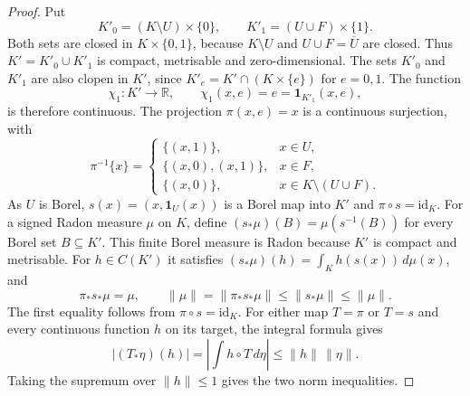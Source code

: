 \documentclass[a4paper,11pt]{amsart}
\theoremstyle{plain}
\theoremstyle{definition}
\theoremstyle{remark}
\newcommand{\R}{\mathbb R}
\newcommand{\one}{\mathbf 1}
\numberwithin{equation}{section}
\begin{document}
\begin{proof}
Put
\[
 K'_0=(K\setminus U)\times\{0\},\qquad
 K'_1=(U\cup F)\times\{1\}.
\]
Both sets are closed in $K\times\{0,1\}$, because $K\setminus U$
and $U\cup F=\overline U$ are closed. Thus $K'=K'_0\cup K'_1$ is
compact, metrisable and zero-dimensional. The sets $K'_0$ and $K'_1$
are also clopen in $K'$, since
$K'_e=K'\cap(K\times\{e\})$ for $e=0,1$. The function
\[
 \chi_1:K'\longrightarrow\R,\qquad
 \chi_1(x,e)=e=\one_{K'_1}(x,e),
\]
is therefore continuous. The projection $\pi(x,e)=x$ is a continuous
surjection, with
\[
 \pi^{-1}\{x\}=
 \begin{cases}
 \{(x,1)\},&x\in U,\\
 \{(x,0),(x,1)\},&x\in F,\\
 \{(x,0)\},&x\in K\setminus(U\cup F).
 \end{cases}
\]
As $U$ is Borel, $s(x)=(x,\one_U(x))$ is a Borel map into $K'$
and $\pi\circ s=\mathrm{id}_K$.
For a signed Radon measure $\mu$ on $K$, define
$(s_*\mu)(B)=\mu(s^{-1}(B))$ for every Borel set $B\subseteq K'$.
This finite Borel measure is Radon because $K'$ is compact and
metrisable. For $h\in C(K')$ it satisfies
$(s_*\mu)(h)=\int_K h(s(x))\,d\mu(x)$, and
\[
 \pi_*s_*\mu=\mu,\qquad
 \|\mu\|=\|\pi_*s_*\mu\|\leqslant\|s_*\mu\|
          \leqslant\|\mu\|.
\]
The first equality follows from $\pi\circ s=\mathrm{id}_K$.
For either map $T=\pi$ or $T=s$ and every continuous function $h$
on its target, the integral formula gives
\[
 |(T_*\eta)(h)|=\left|\int h\circ T\,d\eta\right|
 \leqslant\|h\|\,\|\eta\|.
\]
Taking the supremum over $\|h\|\leqslant1$ gives the two norm
inequalities.


\end{proof}
\end{document}
